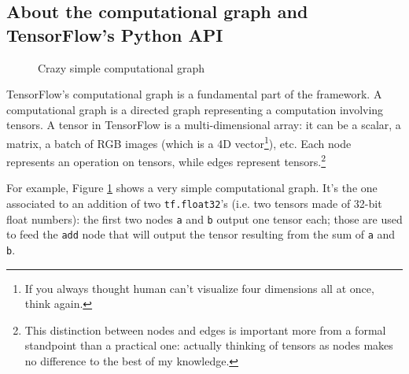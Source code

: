 \subsection{About the computational graph and TensorFlow's Python API}
\label{subsec:computational-graph}

\begin{figure}
  \centering
  \caption[]{Crazy simple computational graph}
  \label{fig:easy-graph}
\end{figure}

TensorFlow's computational graph is a fundamental part of the
framework. A computational graph is a directed graph representing a
computation involving tensors. A tensor in TensorFlow is a
multi-dimensional array: it can be a scalar, a matrix, a batch of RGB
images (which is a 4D vector\footnote{If you always thought human can't
  visualize four dimensions all at once, think again.}), etc. Each node
represents an operation on tensors, while edges represent
tensors.\footnote{This distinction between nodes and edges is important
  more from a formal standpoint than a practical one: actually thinking
  of tensors as nodes makes no difference to the best of my knowledge.}

For example, Figure \ref{fig:easy-graph} shows a very simple
computational graph. It's the one associated to an addition of two
\texttt{tf.float32}'s (i.e. two tensors made of 32-bit float numbers):
the first two nodes \texttt{a} and \texttt{b} output one tensor each;
those are used to feed the \texttt{add} node that will output the
tensor resulting from the sum of \texttt{a} and \texttt{b}.

